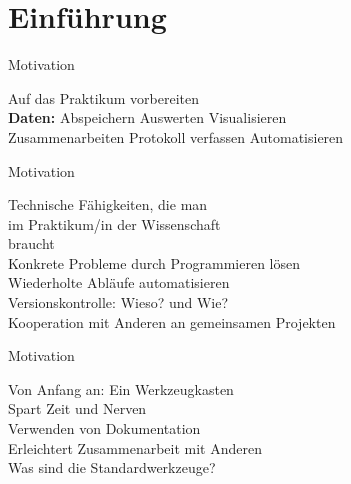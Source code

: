 \section{Einführung}

\begin{frame}{Motivation}
    \begin{center}
        \textcolor{vertexDarkRed}{\Huge Auf das Praktikum vorbereiten} \\[\baselineskip]
        \Large \textbf{Daten:} \hspace{2em} Abspeichern \hspace{2em} Auswerten \hspace{2em} Visualisieren \\ [\baselineskip]
        Zusammenarbeiten \hspace{2em} Protokoll verfassen \hspace{2em} Automatisieren \\
    \end{center}
\end{frame}

\begin{frame}{Motivation}
    \begin{center}
        \textcolor{vertexDarkRed}{\Huge Technische Fähigkeiten, die man \\ im Praktikum/in der Wissenschaft \\ braucht} \\[\baselineskip]
        \Large%
        Konkrete Probleme durch Programmieren lösen\\[\baselineskip]
        Wiederholte Abläufe automatisieren\\[\baselineskip]
        Versionskontrolle: Wieso? und Wie?\\[\baselineskip]
        Kooperation mit Anderen an gemeinsamen Projekten
    \end{center}
\end{frame}

\begin{frame}{Motivation}
    \begin{center}
        \textcolor{vertexDarkRed}{\Huge Von Anfang an: Ein Werkzeugkasten} \\[\baselineskip]
        \Large%
        Spart Zeit und Nerven\\[\baselineskip]
        Verwenden von Dokumentation\\[\baselineskip]
        Erleichtert Zusammenarbeit mit Anderen\\[\baselineskip]
        Was sind die Standardwerkzeuge?
    \end{center}
\end{frame}

